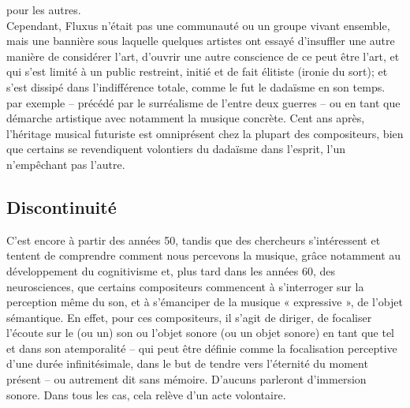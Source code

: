 {pour les autres.\\ \indent \hspace{3mm} Cependant, Fluxus n'était pas une communauté ou un groupe vivant ensemble, mais une bannière sous laquelle quelques artistes ont essayé d'insuffler une autre manière de considérer l'art, d'ouvrir une autre conscience de ce peut être l'art, et qui s'est limité à un public restreint, initié et de fait élitiste (ironie du sort); et s'est dissipé dans l'indifférence totale, comme le fut le dadaïsme en son temps.} par exemple  -- précédé par le surréalisme de l'entre deux guerres -- ou en tant que démarche artistique avec notamment la musique concrète. Cent ans après, l'héritage musical futuriste est omniprésent chez la plupart des compositeurs, bien que certains se revendiquent volontiers du dadaïsme dans l'esprit, l'un n'empêchant pas l'autre. 

\subsection*{Discontinuité}
\label{discontinu}

C'est encore à partir des années 50, tandis que des chercheurs s'intéressent et tentent de comprendre comment nous percevons la musique, grâce notamment au développement du cognitivisme et, plus tard dans les années 60, des neurosciences, que certains compositeurs commencent à s'interroger sur la perception même du son, et à s'émanciper de la musique « expressive », de l'objet sémantique. En effet, pour ces compositeurs, il s'agit de diriger, de focaliser l'écoute sur le (ou un) son ou l'objet sonore (ou un objet sonore) en tant que tel et dans son atemporalité -- qui peut être définie comme la focalisation perceptive d'une durée infinitésimale, dans le but de tendre vers l'éternité du moment présent -- ou autrement dit sans mémoire. D'aucuns parleront d'immersion sonore. Dans tous les cas, cela relève d'un acte volontaire.

